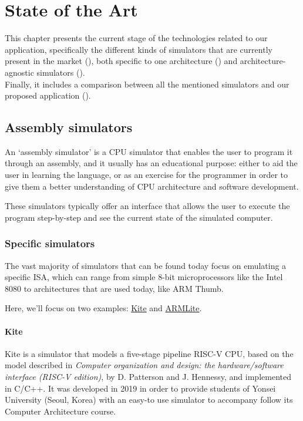 \chapter{State of the Art}\label{chap:state-of-the-art}
This chapter presents the current stage of the technologies related to our application, specifically the different kinds of simulators that are currently present in the market (), both specific to one architecture () and architecture-agnostic simulators ().\\
Finally, it includes a comparison between all the mentioned simulators and our proposed application ().



\section{Assembly simulators}\label{sec:assembly-simulators}
An `\gls{assembly simulator}' is a CPU simulator that enables the user to program it through an \gls{assembly}, and it usually has an educational purpose: either to aid the user in learning the language, or as an exercise for the programmer in order to give them a better understanding of CPU architecture and software development.

These simulators typically offer an interface that allows the user to execute the program step-by-step and see the current state of the simulated \gls{computer}.


\subsection{Specific simulators}\label{subsec:specific-assembly-simulators}
The vast majority of simulators that can be found today focus on emulating a specific \gls{ISA}, which can range from simple 8-bit microprocessors like the Intel 8080\supercite{i8080emulator} to architectures that are used today, like \gls{ARM} Thumb\supercite{QtARMSim}.

\noindent
Here, we'll focus on two examples: \hyperref[subsubsec:kite]{Kite} and \hyperref[subsubsec:armlite]{ARMLite}.


\subsubsection*{Kite}\label{subsubsec:kite}
Kite\supercite{song_kite2019} is a simulator that models a five-stage \gls{pipeline} \gls{RISC-V} CPU, based on the model described in \textit{Computer organization and design: the hardware/software interface (RISC-V edition)}\supercite{PattersonDavidA.2018Coad}, by D. Patterson and J. Hennessy, and implemented in C/C++. It was developed in 2019 in order to provide students of Yonsei University (Seoul, Korea) with an easy-to use simulator to accompany follow its Computer Architecture course.

